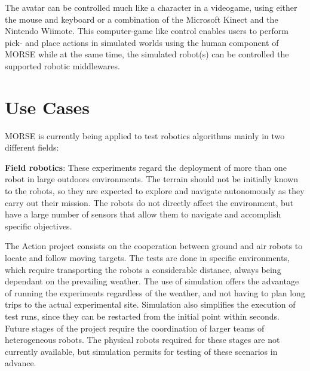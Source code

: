 \documentclass{llncs}
\begin{document}
The avatar can be controlled much like a character in a videogame, using either the mouse and
keyboard or a combination of the Microsoft Kinect and the Nintendo Wiimote. This computer-game like control enables users to 
perform pick- and place actions in simulated worlds using the human component of MORSE while at the same time, the
simulated robot(s) can be controlled the supported robotic middlewares.



\section{Use Cases}
\label{section:usecases}

MORSE is currently being applied to test robotics algorithms mainly in two
different fields:

\textbf{Field robotics}: These experiments regard the deployment of more than
one robot in large outdoors environments. The terrain should not be initially
known to the robots, so they are expected to explore and navigate autonomously
as they carry out their mission.
The robots do not directly affect the environment, but have a large number of
sensors that allow them to navigate and accomplish specific objectives.

The Action \cite{6106782} project consists on the cooperation between ground
and air robots to locate and follow moving targets. The tests are done in
specific environments, which require transporting the robots a considerable
distance, always being dependant on the prevailing weather.  The use of
simulation offers the advantage of running the experiments regardless of the
weather, and not having to plan long trips to the actual experimental site.
Simulation also simplifies the execution of test runs, since they can be
restarted from the initial point within seconds.  Future stages of the project
require the coordination of larger teams of heterogeneous robots. The physical
robots required for these stages are not currently available, but simulation
permits for testing of these scenarios in advance.
\end{document}
